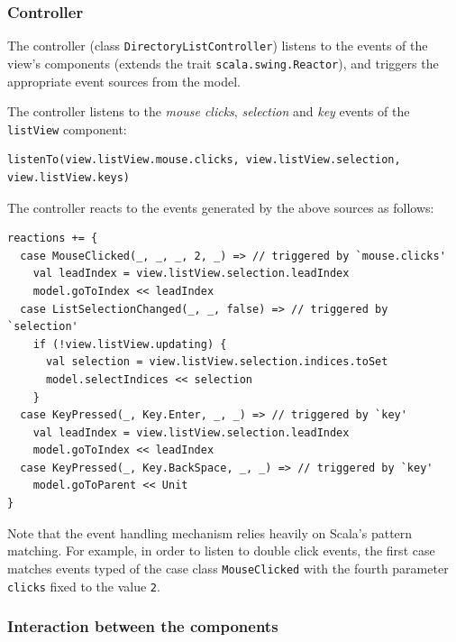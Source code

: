 \subsubsection{Controller}

The controller (class \texttt{DirectoryListController}) listens to the events of the view's components (extends the trait \texttt{scala.swing.Reactor}), and triggers the appropriate event sources from the model. 

The controller listens to the \emph{mouse clicks}, \emph{selection} and \emph{key} events of the \texttt{listView} component:
\begin{lstlisting}
listenTo(view.listView.mouse.clicks, view.listView.selection, view.listView.keys)
\end{lstlisting}


The controller reacts to the events generated by the above sources as follows:
\begin{lstlisting}
reactions += {
  case MouseClicked(_, _, _, 2, _) => // triggered by `mouse.clicks'
    val leadIndex = view.listView.selection.leadIndex
    model.goToIndex << leadIndex
  case ListSelectionChanged(_, _, false) => // triggered by `selection'
    if (!view.listView.updating) {
      val selection = view.listView.selection.indices.toSet
      model.selectIndices << selection
    }
  case KeyPressed(_, Key.Enter, _, _) => // triggered by `key'
    val leadIndex = view.listView.selection.leadIndex
    model.goToIndex << leadIndex
  case KeyPressed(_, Key.BackSpace, _, _) => // triggered by `key'
    model.goToParent << Unit
}
\end{lstlisting}

Note that the event handling mechanism relies heavily on Scala's pattern matching. For example, in order to listen to double click events, the first case matches events typed of the case class \texttt{MouseClicked} with the fourth parameter \texttt{clicks} fixed to the value \texttt{2}. 

\subsubsection{Interaction between the components}

